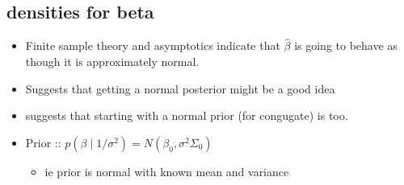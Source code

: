 \subsection{densities for beta}

\begin{itemize}
\item Finite sample theory and asymptotics indicate that
       $\hat{\beta}$ is going to behave as though it is approximately normal.
\item Suggests that getting a normal posterior might be a good idea
\item suggests that starting with a normal prior (for congugate) is too.
\item Prior :: $p(\beta \mid 1/\sigma^{2}) = N(\beta_{0}, \sigma^2 \Sigma_{0})$
\begin{itemize}
\item ie prior is normal with known mean and variance
\end{itemize}
\end{itemize}

